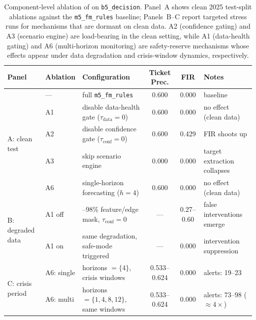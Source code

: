 \begin{table}[t]
\centering
\footnotesize
\setlength{\tabcolsep}{4pt}
\caption{Component-level ablation of \sysname{} on
\texttt{b5\_decision}. Panel~A shows clean 2025 test-split ablations against
the \texttt{m5\_fm\_rules} baseline; Panels~B--C report targeted stress runs
for mechanisms that are dormant on clean data. A2 (confidence gating) and A3
(scenario engine) are load-bearing in the clean setting, while A1
(data-health gating) and A6 (multi-horizon monitoring) are safety-reserve
mechanisms whose effects appear under data degradation and crisis-window
dynamics, respectively.}
\label{tab:ablation}
\begin{tabularx}{\textwidth}{@{}l l >{\raggedright\arraybackslash}X c c >{\raggedright\arraybackslash}X@{}}
\toprule
Panel & Ablation & Configuration & Ticket Prec. & FIR & Notes \\
\midrule
\multirow{5}{*}{A: clean test}
 & ---  & full \texttt{m5\_fm\_rules}                                       & 0.600 & 0.000 & baseline \\
 & A1   & disable data-health gate ($\tau_{\mathrm{data}}{=}0$)             & 0.600 & 0.000 & no effect (clean data) \\
 & A2   & disable confidence gate ($\tau_{\mathrm{conf}}{=}0$)              & 0.600 & 0.429 & FIR shoots up \\
 & A3   & skip scenario engine                                              & 0.000 & 0.000 & target extraction collapses \\
 & A6   & single-horizon forecasting ($h{=}4$)                              & 0.600 & 0.000 & no effect (clean data) \\
\midrule
\multirow{2}{*}{B: degraded data}
 & A1 off & 80--98\% feature/edge mask, $\tau_{\mathrm{conf}}{=}0$          & ---   & 0.27--0.60 & false interventions emerge \\
 & A1 on  & same degradation, safe-mode triggered                           & ---   & 0.000      & intervention suppression \\
\midrule
\multirow{2}{*}{C: crisis period}
 & A6: single & horizons $=\{4\}$, crisis windows                         & 0.533--0.624 & 0.000 & alerts: 19--23 \\
 & A6: multi  & horizons $=\{1,4,8,12\}$, same windows                    & 0.533--0.624 & 0.000 & alerts: 73--98 ($\approx4\times$) \\
\bottomrule
\end{tabularx}
\end{table}

